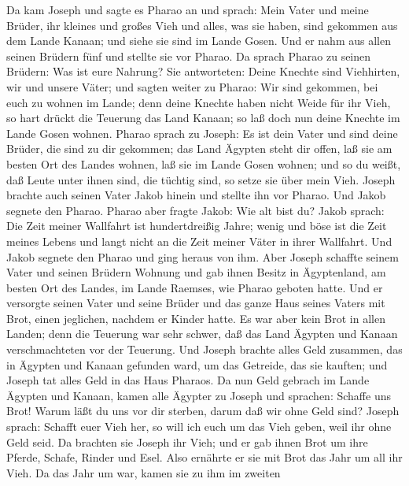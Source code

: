  Da kam Joseph und sagte es Pharao an und sprach: Mein Vater
und meine Brüder, ihr kleines und großes Vieh und alles, was sie haben,
sind gekommen aus dem Lande Kanaan; und siehe sie sind im Lande Gosen.
 Und er nahm aus allen seinen Brüdern fünf und stellte sie
vor Pharao.  Da sprach Pharao zu seinen Brüdern: Was ist
eure Nahrung? Sie antworteten: Deine Knechte sind Viehhirten, wir und
unsere Väter;  und sagten weiter zu Pharao: Wir sind
gekommen, bei euch zu wohnen im Lande; denn deine Knechte haben nicht
Weide für ihr Vieh, so hart drückt die Teuerung das Land Kanaan; so laß
doch nun deine Knechte im Lande Gosen wohnen.  Pharao sprach
zu Joseph: Es ist dein Vater und sind deine Brüder, die sind zu dir
gekommen;  das Land Ägypten steht dir offen, laß sie am
besten Ort des Landes wohnen, laß sie im Lande Gosen wohnen; und so du
weißt, daß Leute unter ihnen sind, die tüchtig sind, so setze sie über
mein Vieh.  Joseph brachte auch seinen Vater Jakob hinein
und stellte ihn vor Pharao. Und Jakob segnete den Pharao. 
Pharao aber fragte Jakob: Wie alt bist du?  Jakob sprach:
Die Zeit meiner Wallfahrt ist hundertdreißig Jahre; wenig und böse ist
die Zeit meines Lebens und langt nicht an die Zeit meiner Väter in ihrer
Wallfahrt.  Und Jakob segnete den Pharao und ging heraus
von ihm.  Aber Joseph schaffte seinem Vater und seinen
Brüdern Wohnung und gab ihnen Besitz in Ägyptenland, am besten Ort des
Landes, im Lande Raemses, wie Pharao geboten hatte.  Und er
versorgte seinen Vater und seine Brüder und das ganze Haus seines Vaters
mit Brot, einen jeglichen, nachdem er Kinder hatte.  Es war
aber kein Brot in allen Landen; denn die Teuerung war sehr schwer, daß
das Land Ägypten und Kanaan verschmachteten vor der Teuerung.
 Und Joseph brachte alles Geld zusammen, das in Ägypten und
Kanaan gefunden ward, um das Getreide, das sie kauften; und Joseph tat
alles Geld in das Haus Pharaos.  Da nun Geld gebrach im
Lande Ägypten und Kanaan, kamen alle Ägypter zu Joseph und sprachen:
Schaffe uns Brot! Warum läßt du uns vor dir sterben, darum daß wir ohne
Geld sind?  Joseph sprach: Schafft euer Vieh her, so will
ich euch um das Vieh geben, weil ihr ohne Geld seid.  Da
brachten sie Joseph ihr Vieh; und er gab ihnen Brot um ihre Pferde,
Schafe, Rinder und Esel. Also ernährte er sie mit Brot das Jahr um all
ihr Vieh.  Da das Jahr um war, kamen sie zu ihm im zweiten
